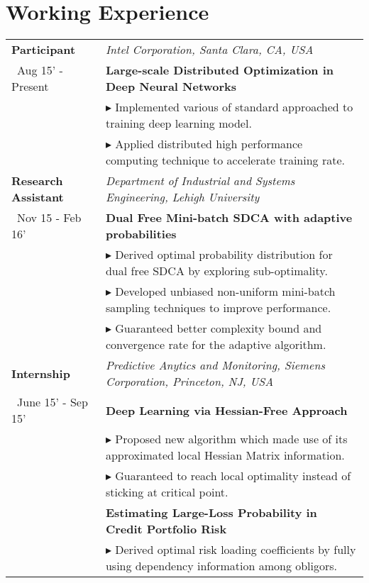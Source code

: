 \documentclass[letters,11pt]{article} %
\newcommand{\lst}[1]{\quad\footnotesize{$\blacktriangleright$ #1.}}
\begin{document}
\section{Working Experience}
\begin{longtable}{>{\centering}p{3.35cm}|p{14cm}}
    \small{\textbf{Participant}}& \textit{Intel Corporation, Santa Clara, CA, USA}\\\
    \small{Aug 15' - Present}&\textbf{Large-scale Distributed Optimization in Deep Neural Networks}\\ 
    & \lst{Implemented various of standard approached to training deep learning model}\\
    &\lst {Applied distributed high performance computing technique to accelerate training rate}\\
    \small{\textbf{Research Assistant}}& \textit{Department of Industrial and Systems Engineering, Lehigh University}\\\
    \small{Nov 15 - Feb 16'}&\textbf{Dual Free Mini-batch SDCA with adaptive probabilities}\\ 
    & \lst{Derived optimal probability distribution for dual free SDCA by exploring sub-optimality}\\
        &\lst {Developed unbiased non-uniform mini-batch sampling techniques to improve performance}\\
 & \lst{Guaranteed better complexity bound and convergence rate for the adaptive algorithm}\\
    \small{\textbf{Internship}}& \textit{Predictive Anytics and Monitoring, Siemens Corporation, Princeton, NJ, USA}\\\
    \small{June 15' - Sep 15'}&\textbf{Deep Learning via Hessian-Free Approach}\\
    & \lst{Proposed new algorithm which made use of its approximated local Hessian Matrix information}\\
    &\lst{Guaranteed to reach local optimality instead of sticking at critical point}\\
    & \textbf{Estimating Large-Loss Probability in Credit Portfolio Risk}   \\
    &  \lst{Derived optimal risk loading coefficients by fully using dependency information among obligors}\\

\end{longtable}
\end{document}
